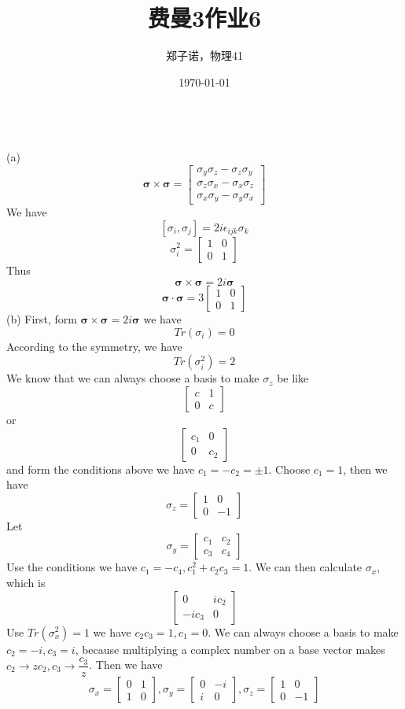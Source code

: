 \documentclass[utf8]{ctexart}
\title{费曼3作业6}
\author{郑子诺，物理41}
\date{\today}
\begin{document}
\maketitle
{}\\
(a)
\[\bm{\sigma}\times\bm{\sigma}=\begin{bmatrix}
	\sigma_y\sigma_z-\sigma_z\sigma_y\\
	\sigma_z\sigma_x-\sigma_x\sigma_z\\
	\sigma_x\sigma_y-\sigma_y\sigma_x
\end{bmatrix}\]
We have
\[[\sigma_i,\sigma_j]=2i\epsilon_{ijk}\sigma_k\]
\[\sigma^2_i=\begin{bmatrix}
	1&0\\
	0&1
\end{bmatrix}\]
Thus
\[\bm{\sigma}\times\bm{\sigma}=2i\bm{\sigma}\]
\[\bm{\sigma}\cdot\bm{\sigma}=
3\begin{bmatrix}
	1&0\\
	0&1
\end{bmatrix}\]
(b)
First, form $\bm{\sigma}\times\bm{\sigma}=2i\bm{\sigma}$ we have
\[Tr(\sigma_i)=0\]
According to the symmetry, we have
\[Tr(\sigma^2_i)=2\]
We know that we can always choose a basis to make $\sigma_z$ be like
\[\begin{bmatrix}
	c&1\\
	0&c
\end{bmatrix}\]
or
\[\begin{bmatrix}
	c_1&0\\
	0&c_2
\end{bmatrix}\]
and form the conditions above we have $c_1=-c_2=\pm1$. Choose $c_1=1$, then we have
\[\sigma_z=\begin{bmatrix}
	1&0\\
	0&-1
\end{bmatrix}\]
Let
\[\sigma_y=\begin{bmatrix}
	c_1&c_2\\
	c_3&c_4
\end{bmatrix}\]
Use the conditions we have $c_1=-c_4,c_1^2+c_2c_3=1$. We can then calculate $\sigma_x$, which is
\[\begin{bmatrix}
	0&ic_2\\
	-ic_3&0
\end{bmatrix}\]
Use $Tr(\sigma_x^2)=1$ we have $c_2c_3=1,c_1=0$. We can always choose a basis to make $c_2=-i,c_3=i$, because multiplying a complex number on a base vector makes $c_2\rightarrow zc_2,c_3\rightarrow \dfrac{c_3}{z}$. Then we have
\[\sigma_x=\begin{bmatrix}
	0&1\\
	1&0
\end{bmatrix},\sigma_y=\begin{bmatrix}
0&-i\\
i&0
\end{bmatrix},\sigma_z=\begin{bmatrix}
1&0\\
0&-1
\end{bmatrix}\]
\end{document}
